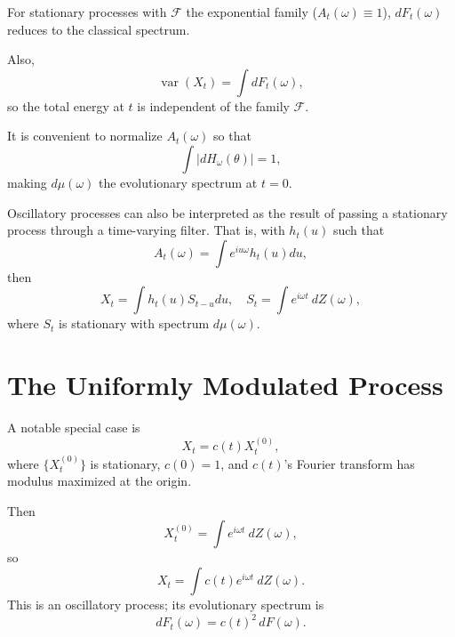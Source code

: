 \documentclass[12pt]{article}
\theoremstyle{definition}
\theoremstyle{plain}
\theoremstyle{remark}
\begin{document}
For stationary processes with $\mathcal{F}$ the exponential family ($A_t(\omega) \equiv 1$), $dF_t(\omega)$ reduces to the classical spectrum.

Also,
\begin{equation}
\operatorname{var}(X_t) = \int dF_t(\omega), 
\label{eq:var_evospec}
\end{equation}
so the total energy at $t$ is independent of the family $\mathcal{F}$.

It is convenient to normalize $A_t(\omega)$ so that
\begin{equation}
\int |dH_\omega(\theta)| = 1,
\label{eq:A_norm}
\end{equation}
making $d\mu(\omega)$ the evolutionary spectrum at $t=0$.

Oscillatory processes can also be interpreted as the result of passing a stationary process through a time-varying filter. That is, with $h_t(u)$ such that
\begin{equation}
A_t(\omega) = \int e^{i u \omega} h_t(u) du,
\label{eq:A_filter}
\end{equation}
then
\begin{equation}
X_t = \int h_t(u) S_{t-u} du, \quad S_{t} = \int e^{i\omega t}\ dZ(\omega),
\label{eq:X_filter}
\end{equation}
where $S_t$ is stationary with spectrum $d\mu(\omega)$.

\section{The Uniformly Modulated Process}

A notable special case is
\begin{equation}
X_t = c(t) X^{(0)}_t,
\label{eq:uniformly_modulated}
\end{equation}
where $\{ X_t^{(0)} \}$ is stationary, $c(0)=1$, and $c(t)$'s Fourier transform has modulus maximized at the origin.

Then
\begin{equation}
X^{(0)}_t = \int e^{i\omega t}\ dZ(\omega),
\label{eq:stationary_decomp}
\end{equation}
so
\begin{equation}
X_t = \int c(t) e^{i\omega t}\ dZ(\omega).
\label{eq:um_decomp}
\end{equation}
This is an oscillatory process; its evolutionary spectrum is
\begin{equation}
dF_t(\omega) = c(t)^2\, dF(\omega).
\label{eq:um_spec}
\end{equation}
\end{document}
